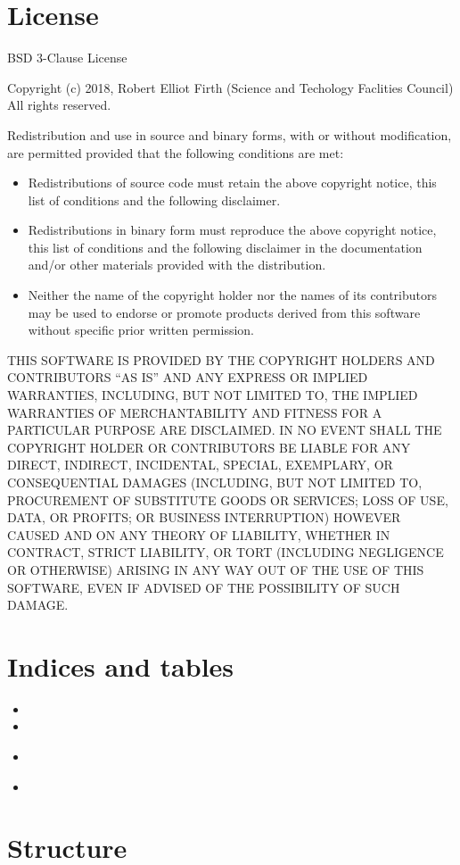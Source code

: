 \documentclass[letterpaper,10pt,english]{sphinxmanual}
\begin{document}
\chapter{License}
\label{\detokenize{license::doc}}\label{\detokenize{license:license}}
BSD 3-Clause License

Copyright (c) 2018, Robert Elliot Firth (Science and Techology Faclities Council)
All rights reserved.

Redistribution and use in source and binary forms, with or without
modification, are permitted provided that the following conditions are met:
\begin{itemize}
\item {} 
Redistributions of source code must retain the above copyright notice, this
list of conditions and the following disclaimer.

\item {} 
Redistributions in binary form must reproduce the above copyright notice,
this list of conditions and the following disclaimer in the documentation
and/or other materials provided with the distribution.

\item {} 
Neither the name of the copyright holder nor the names of its
contributors may be used to endorse or promote products derived from
this software without specific prior written permission.

\end{itemize}

THIS SOFTWARE IS PROVIDED BY THE COPYRIGHT HOLDERS AND CONTRIBUTORS “AS IS”
AND ANY EXPRESS OR IMPLIED WARRANTIES, INCLUDING, BUT NOT LIMITED TO, THE
IMPLIED WARRANTIES OF MERCHANTABILITY AND FITNESS FOR A PARTICULAR PURPOSE ARE
DISCLAIMED. IN NO EVENT SHALL THE COPYRIGHT HOLDER OR CONTRIBUTORS BE LIABLE
FOR ANY DIRECT, INDIRECT, INCIDENTAL, SPECIAL, EXEMPLARY, OR CONSEQUENTIAL
DAMAGES (INCLUDING, BUT NOT LIMITED TO, PROCUREMENT OF SUBSTITUTE GOODS OR
SERVICES; LOSS OF USE, DATA, OR PROFITS; OR BUSINESS INTERRUPTION) HOWEVER
CAUSED AND ON ANY THEORY OF LIABILITY, WHETHER IN CONTRACT, STRICT LIABILITY,
OR TORT (INCLUDING NEGLIGENCE OR OTHERWISE) ARISING IN ANY WAY OUT OF THE USE
OF THIS SOFTWARE, EVEN IF ADVISED OF THE POSSIBILITY OF SUCH DAMAGE.


\chapter{Indices and tables}
\label{\detokenize{index:indices-and-tables}}\begin{itemize}
\item {} 

\item {} 

\item {} 
{\hyperref[\detokenize{license::doc}]{}}

\item {} 

\end{itemize}


\chapter{Structure}
\label{\detokenize{index:structure}}


\renewcommand{\indexname}{Index}
\printindex
\end{document}
